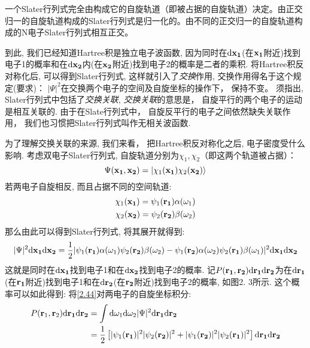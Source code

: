 一个Slater行列式完全由构成它的自旋轨道（即被占据的自旋轨道）决定。由正交归一的自旋轨道构成的Slater行列式是归一化的。由不同的正交归一的自旋轨道构成的N电子Slater行列式相互正交。


到此, 
我们已经知道Hartree积是独立电子波函数, 
因为同时在$\dd\bo{x_1}$(在$\mathbf{x_1}$附近)找到电子1的概率和在$\dd\bo{x_2}$内(在$\mathbf{x_2}$附近)找到电子2的概率是二者的乘积. 
将Hartree积反对称化后, 
可以得到Slater行列式, 
这样就引入了\emph{交换}作用, 
交换作用得名于这个规定(要求)： $|\Psi|^2$在交换两个电子的空间及自旋坐标的操作下，
保持不变。 
须指出, 
Slater行列式中包括了\emph{交换关联}, 
\emph{交换关联}的意思是，
自旋平行的两个电子的运动是相互关联的. 
由于在Slate行列式中，
自旋反平行的电子之间依然缺失关联作用，
我们也习惯把Slater行列式叫作无相关波函数.


为了理解交换关联的来源, 
我们来看，
把Hartree积反对称化之后, 
电子密度受什么影响. 
考虑双电子Slater行列式, 
自旋轨道分别为$\chi_1,\chi_2$（即这两个轨道被占据）：
\begin{equation}
\Psi(\mathbf{x_1,x_2})=\Ket{\chi_1(\mathbf{x_1})\chi_2(\mathbf{x_2})}
\end{equation}
若两电子自旋相反, 
而且占据不同的空间轨道:
\begin{align}
\chi_1(\mathbf{x_1})=\psi_1(\mathbf{r_1})\alpha(\omega_1)\\
\chi_2(\mathbf{x_2})=\psi_2(\mathbf{r_2})\beta(\omega_2)
\end{align}
那么由此可以得到Slater行列式, 
将其展开就得到:
\begin{equation}
\label{2.44}
|\Psi|^2\dd\bo{x_1}\dd\bo{x_2}=\frac{1}{2}|\psi_1(\bo{r_1})\alpha(\omega_1)\psi_2(\bo{r_2})\beta(\omega_2)-\psi_1(\bo{r_2})\alpha(\omega_2)\psi_2(\bo{r_1})\beta(\omega_1)|^2\dd\bo{x_1}\dd\bo{x_2}
\end{equation}
这就是同时在$\dd\bo{x_1}$找到电子1和在$\dd\bo{x_2}$找到电子2的概率. 
记$P(\bo{r_1,r_2})\dd\bo{r_1}\dd\bo{r_2}$为在$\dd\bo{r_1}$(在$\mathbf{r_1}$附近)找到电子1和在$\dd\bo{r_2}$(在$\mathbf{r_2}$附近)找到电子2的概率, 
如图2.
3所示. 
这个概率可以如此得到: 将\autoref{2.44}对两电子的自旋坐标积分:
\begin{align}
\label{2.45}
P(\mathbf{r}_1,\mathbf{r}_2)\dd\bo{r_1}\dd\bo{r_2}&=\int\dd\omega_1\dd\omega_2|\Psi|^2\db{r_1}\db{r_2}\notag\\
&=\frac{1}{2}\left[|\psi_1(\bo{r_1})|^2|\psi_2(\bo{r_2})|^2+|\psi_1(\bo{r_2})|^2|\psi_2(\bo{r_1})|^2\right]\db{r_1}\db{r_2}
\end{align}

